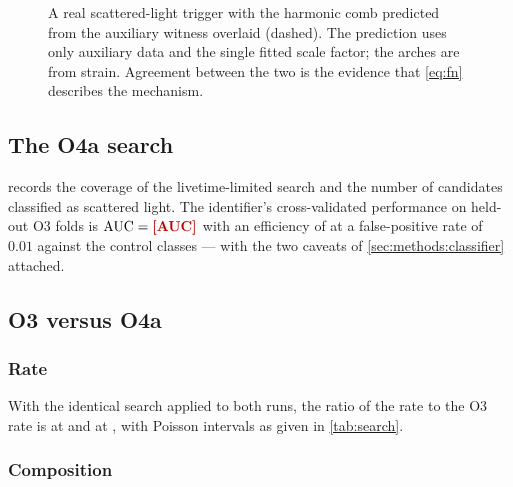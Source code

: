 \begin{figure}[htbp]
\centering
{}
\caption{A real scattered-light trigger with the harmonic comb predicted from
the auxiliary witness overlaid (dashed). The prediction uses only auxiliary
data and the single fitted scale factor; the arches are from strain. Agreement
between the two is the evidence that \cref{eq:fn} describes the mechanism.}
\label{fig:predictor}
\end{figure}

\subsection{The O4a search}
\label{sec:results:o4a}

 records the coverage of the livetime-limited search and the
number of candidates classified as scattered light. The identifier's
cross-validated performance on held-out O3 folds is
$\mathrm{AUC} = \ResultClassifierAuc$ with an efficiency of
\ResultClassifierEfficiency{} at a false-positive rate of $0.01$ against the
control classes --- with the two caveats of \cref{sec:methods:classifier}
attached.

\begin{table}[htbp]
\centering
\caption{Blind-search coverage and yield. Rates are per hour of \emph{analysed}
livetime; the coverage fraction is the analysed livetime as a fraction of the
epoch's total.}
\label{tab:search}
\small
{}
\end{table}

\subsection{O3 versus O4a}
\label{sec:results:comparison}

\subsubsection{Rate}

With the identical search applied to both runs, the ratio of the \Ofa{} rate
to the O3 rate is \ResultRateRatioHOne{} at \Hone{} and \ResultRateRatioLOne{}
at \Lone, with Poisson intervals as given in \cref{tab:search}.

\subsubsection{Composition}

